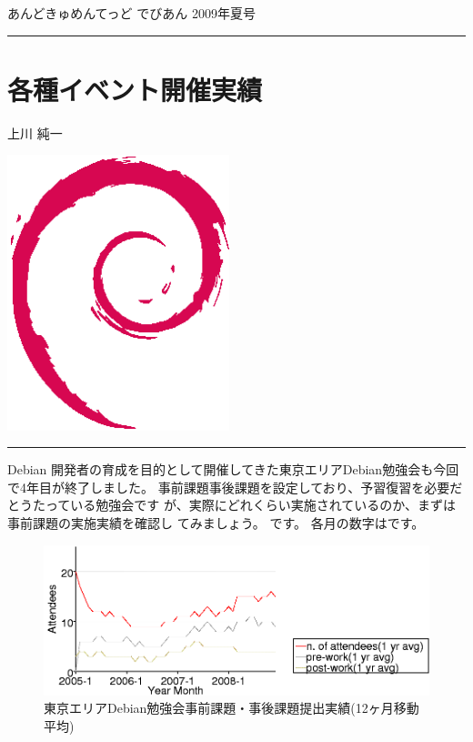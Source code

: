 \documentclass[mingoth,a4paper]{jsarticle}
\renewcommand{\dancersection}[2]{%
\newpage
あんどきゅめんてっど でびあん 2009年夏号
%
\vspace{0.1mm}\\
{\color{dancerlightblue}\rule{\hsize}{2mm}}

%
%
\begin{minipage}[t]{0.6\hsize}
\color{dancerdarkblue}
\vspace{1cm}
\section{#1}
\hfill{}#2\\
\end{minipage}
\begin{minipage}[t]{0.4\hsize}
\vspace{-2cm}
\hfill{}\includegraphics[height=8cm]{image200502/openlogo-nd.eps}\\
\vspace{-5cm}
\end{minipage}
%
%
{\color{dancerdarkblue}\rule{0.74\hsize}{2mm}}
%
\vspace{2cm}
}
\begin{document}
\begin{commandline}
\dancersection{各種イベント開催実績}{上川 純一}
\label{sec:debmtg2008results}

Debian 開発者の育成を目的として開催してきた東京エリアDebian勉強会も今回
で4年目が終了しました。
事前課題事後課題を設定しており、予習復習を必要だとうたっている勉強会です
が、実際にどれくらい実施されているのか、まずは事前課題の実施実績を確認し
てみましょう。
です。
各月の数字はです。


\begin{figure}[ht]
 \includegraphics[width=1\hsize]{image200812/memberanalysis/attend.png}
\caption{東京エリアDebian勉強会事前課題・事後課題提出実績(12ヶ月移動平均)}\label{fig:attendandprepostwork}
\end{figure}


\end{commandline}
\end{document}
